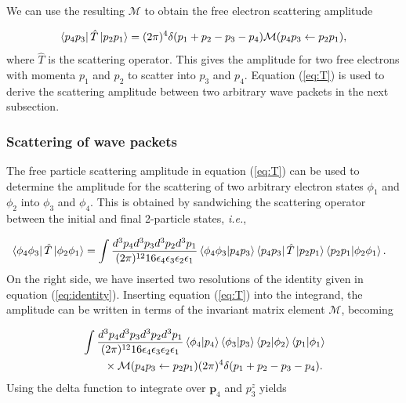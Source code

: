 \documentclass[twoside,twocolumn,9pt]{article}
\begin{document}
We can use the resulting $\mathcal{M}$ to obtain the free electron scattering
amplitude

\begin{equation} 
  \label{eq:T} 
  \bra{p_4 p_3}\hat{T}\ket{p_2p_1} 
  = 
  (2\pi)^4\delta(p_1 + p_2 - p_3 - p_4) 
  \mathcal{M}(p_4p_3\leftarrow p_2p_1),
\end{equation}
%
where $\hat{T}$ is the scattering operator.\cite{Peskin1995, Lancaster2014}
This gives the amplitude for two free electrons with momenta $p_1$ and $p_2$ to
scatter into $p_3$ and $p_4$.
Equation (\ref{eq:T}) is used to derive the scattering amplitude between two
arbitrary wave packets in the next subsection.

\subsubsection{Scattering of wave packets} 
\label{sec:wavepackets}

The free particle scattering amplitude in equation (\ref{eq:T}) can be used to
determine the amplitude for the scattering of two arbitrary electron states
$\phi_1$ and $\phi_2$ into $\phi_3$ and $\phi_4$.
This is obtained by sandwiching the scattering operator between the initial and
final 2-particle states, \textit{i.e.},

\begin{equation} 
  \label{eq:amp} 
  \begin{aligned}
    &\bra{\phi_4\phi_3} \hat{T} \ket{\phi_2\phi_1}
    = 
    \int \frac{d^3p_4d^3p_3d^3p_2d^3p_1} {(2\pi)^{12}
    16\epsilon_4\epsilon_3\epsilon_2\epsilon_1}
    \bra{\phi_4\phi_3}\ket{p_4p_3} \bra{p_4p_3}\hat{T}\ket{p_2p_1}
    \bra{p_2p_1}\ket{\phi_2\phi_1}.
\end{aligned} 
\end{equation}
%
On the right side, we have inserted two resolutions of the identity given in
equation (\ref{eq:identity}). Inserting equation (\ref{eq:T}) into the
integrand, the amplitude can be written in terms of the invariant matrix
element $\mathcal{M}$, becoming

\begin{equation} 
  \label{eq:ampPlugInM} 
  \begin{aligned}
    &\int\frac{d^3p_4d^3p_3d^3p_2d^3p_1} {(2\pi)^{12}
    16\epsilon_4\epsilon_3\epsilon_2\epsilon_1} \bra{\phi_4}\ket{p_4}
    \bra{\phi_3}\ket{p_3} \bra{p_2}\ket{\phi_2} \bra{p_1}\ket{\phi_1}
    \\&\qquad\times 
    \mathcal{M}(p_4p_3\leftarrow p_2p_1) 
    (2\pi)^4\delta(p_1 + p_2 - p_3 - p_4).  
\end{aligned} 
\end{equation}
%
Using the delta function to integrate over $\mathbf{p}_4$ and $p_3^z$ yields
\end{document}
